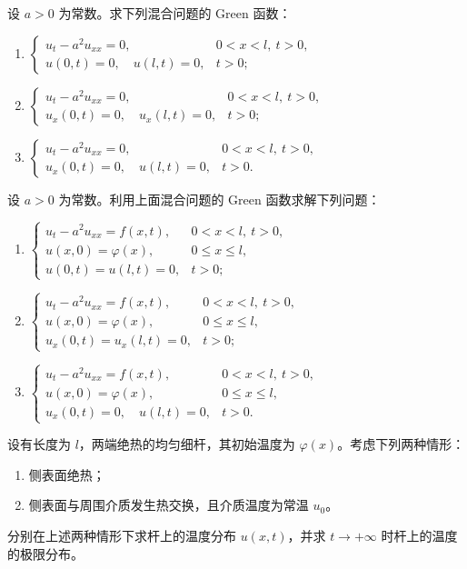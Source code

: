 \documentclass[../../main.tex]{subfiles}%
\begin{document}
\begin{example}
设 $a>0$ 为常数。求下列混合问题的 Green 函数：
\begin{enumerate}[(1)]
\item $\begin{cases}
u_t-a^2u_{xx}=0, & 0<x<l,\ t>0,\\
u(0,t)=0,\quad u(l,t)=0, & t>0;
\end{cases}$
\item $\begin{cases}
u_t-a^2u_{xx}=0, & 0<x<l,\ t>0,\\
u_x(0,t)=0,\quad u_x(l,t)=0, & t>0;
\end{cases}$
\item $\begin{cases}
u_t-a^2u_{xx}=0, & 0<x<l,\ t>0,\\
u_x(0,t)=0,\quad u(l,t)=0, & t>0.
\end{cases}$
\end{enumerate}
\end{example}

\begin{example}
设 $a>0$ 为常数。利用上面混合问题的 Green 函数求解下列问题：
\begin{enumerate}[(1)]
\item $\begin{cases}
u_t-a^2u_{xx}=f(x,t), & 0<x<l,\ t>0,\\
u(x,0)=\varphi(x), & 0\leqslant x\leqslant l,\\
u(0,t)=u(l,t)=0, & t>0;
\end{cases}$
\item $\begin{cases}
u_t-a^2u_{xx}=f(x,t), & 0<x<l,\ t>0,\\
u(x,0)=\varphi(x), & 0\leqslant x\leqslant l,\\
u_x(0,t)=u_x(l,t)=0, & t>0;
\end{cases}$
\item $\begin{cases}
u_t-a^2u_{xx}=f(x,t), & 0<x<l,\ t>0,\\
u(x,0)=\varphi(x), & 0\leqslant x\leqslant l,\\
u_x(0,t)=0,\quad u(l,t)=0, & t>0.
\end{cases}$
\end{enumerate}
\end{example}

\begin{example}
设有长度为 $l$，两端绝热的均匀细杆，其初始温度为 $\varphi(x)$。考虑下列两种情形：
\begin{enumerate}[(1)]
\item 侧表面绝热；
\item 侧表面与周围介质发生热交换，且介质温度为常温 $u_0$。
\end{enumerate}
分别在上述两种情形下求杆上的温度分布 $u(x,t)$，并求 $t\to+\infty$ 时杆上的温度的极限分布。
\end{example}
\end{document}
